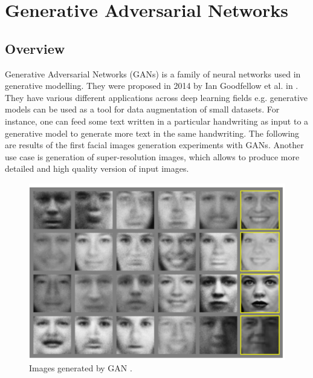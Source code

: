 \documentclass[12pt,a4paper,openany]{book}
\begin{document}
\section{Generative Adversarial Networks}


\subsection{Overview}

\noindent Generative Adversarial Networks (GANs) is a family of neural networks used in generative modelling. They were proposed in 2014 by Ian Goodfellow et al. in \cite{gan}.\\
\noindent They have various different applications across deep learning fields e.g. generative models can be used as a tool for data augmentation of small datasets. For instance, one can feed some text written in a particular handwriting as input to a generative model to generate more text in the same handwriting. The following are results of the first facial images generation experiments with GANs. Another use case is generation of super-resolution images, which allows to produce more detailed and high quality version of input images. 

 \begin{figure}[ht!]
     \centering
     \includegraphics[scale=0.4]{figs/faces.png}
     \caption{Images generated by GAN \cite{gan}.}
 \end{figure}
 
\end{document}
